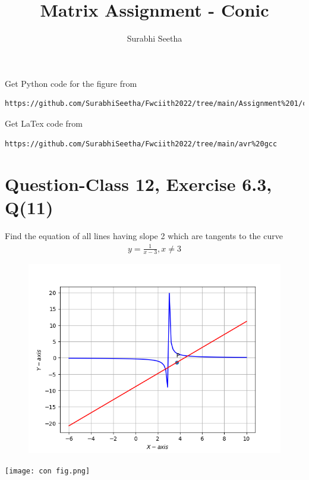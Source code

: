 \documentclass[journal,12pt,twocolumn]{IEEEtran}
\begin{document}
\def\putbox#1#2#3{\makebox[0in][l]{\makebox[#1][l]{}\raisebox{\baselineskip}[0in][0in]{\raisebox{#2}[0in][0in]{#3}}}}
     \def\rightbox#1{\makebox[0in][r]{#1}}
     \def\centbox#1{\makebox[0in]{#1}}
     \def\topbox#1{\raisebox{-\baselineskip}[0in][0in]{#1}}
     \def\midbox#1{\raisebox{-0.5\baselineskip}[0in][0in]{#1}}
\vspace{3cm}
\title{\textbf{Matrix Assignment - Conic} }
\author{Surabhi Seetha}
\maketitle
\newpage
\bigskip
\renewcommand{\thefigure}{\theenumi}
\renewcommand{\thetable}{\theenumi}
Get Python code for the figure from 
\begin{lstlisting}
https://github.com/SurabhiSeetha/Fwciith2022/tree/main/Assignment%201/codes/src
\end{lstlisting}
Get LaTex code from
\begin{lstlisting}
https://github.com/SurabhiSeetha/Fwciith2022/tree/main/avr%20gcc
\end{lstlisting}
%
\section{Question-Class 12, Exercise 6.3, Q(11)}
\raggedright
\fi
Find the equation of all lines having slope 2 which are tangents to the curve 
\begin{align}
y=\frac{1}{x-3}, x\neq{3} 
\end{align}
\solution 
	\begin{figure}[!ht]
		\centering
 \includegraphics[width=\columnwidth]{chapters/12/6/3/11/figs/con_fig.png}
		\caption{}
		\label{fig:12/6/3/11}
  	\end{figure}
	\iffalse
\vspace{0.25cm}
\texttt{[image: con fig.png]}\\
\label{fig:circle_1}
\end{document}

